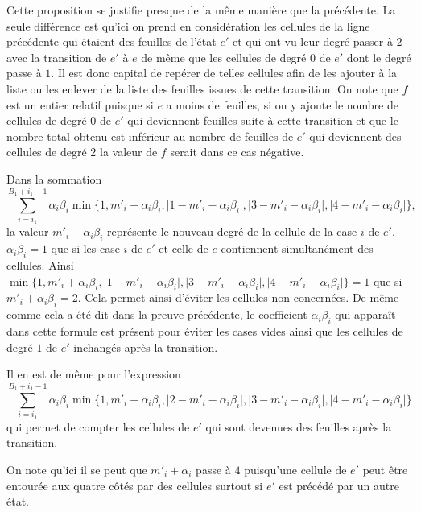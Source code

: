 \begin{Pre}
  Cette proposition se justifie presque de la même manière que la précédente. La seule différence est qu'ici on prend en considération les cellules de la ligne précédente qui étaient des feuilles de l'état $e'$ et qui ont vu leur degré passer à $2$ avec la transition de $e'$ à $e$ de même que les cellules de degré $0$ de $e'$ dont le degré passe à $1$. Il est donc capital de repérer de telles cellules afin de les ajouter à  la liste ou les enlever de la liste des feuilles issues de cette transition. On note que $f$ est un entier relatif puisque si $e$ a moins de feuilles, si on y ajoute le nombre de cellules de degré $0$ de $e'$ qui deviennent feuilles suite à cette transition et que le nombre total obtenu est inférieur au nombre de feuilles de $e'$ qui deviennent des cellules de degré $2$ la valeur de $f$ serait dans ce cas négative.
  
 Dans la sommation $$\sum_{i=i_{1}}^{B_{1}+i_{1}-1}\alpha_{i}\beta_{i}\min\{1,m'_{i} +\alpha_{i}\beta_{i},\vert 1-m'_{i}-\alpha_{i}\beta_{i}\vert, \vert 3-m'_{i}-\alpha_{i}\beta_{i}\vert,\vert 4-m'_{i}-\alpha_{i}\beta_{i}\vert\},$$ la valeur $m'_{i} +\alpha_{i}\beta_{i}$ représente le nouveau degré de la cellule de la case $i$ de $e'$. $\alpha_{i}\beta_{i}=1$ que si les case $i$ de $e'$ et celle de $e$ contiennent simultanément des cellules. Ainsi $\min\{1,m'_{i} +\alpha_{i}\beta_{i},\vert 1-m'_{i}-\alpha_{i}\beta_{i}\vert, \vert 3-m'_{i}-\alpha_{i}\beta_{i}\vert,\vert 4-m'_{i}-\alpha_{i}\beta_{i}\vert\}=1$ que si $m'_{i}+\alpha_{i}\beta_{i}=2$. Cela permet ainsi d'éviter les cellules non concernées. De même comme cela a été dit dans la preuve précédente, le coefficient $\alpha_{i}\beta_{i}$ qui apparaît dans cette formule est présent pour éviter les cases vides ainsi que les cellules de degré $1$ de $e'$ inchangés après la transition.
 
 Il en est de même pour l'expression $$\sum_{i=i_{1}}^{B_{1}+i_{1}-1}\alpha_{i}\beta_{i}\min\{1,m'_{i} +\alpha_{i}\beta_{i},\vert 2-m'_{i}-\alpha_{i}\beta_{i}\vert, \vert 3-m'_{i}-\alpha_{i}\beta_{i}\vert,\vert 4-m'_{i}-\alpha_{i}\beta_{i}\vert\}$$ qui permet de compter les cellules de $e'$ qui sont devenues des feuilles après la transition.
 
 On note qu'ici il se peut que $m'_{i} +\alpha_{i}$ passe à $4$ puisqu'une cellule de $e'$ peut être entourée aux quatre côtés par des cellules surtout si $e'$ est précédé par un autre état.
\end{Pre}
